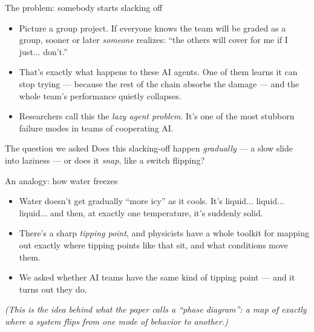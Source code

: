 \documentclass[aspectratio=169]{beamer}
\begin{document}
\begin{frame}{The problem: somebody starts slacking off}
  \begin{itemize}
    \item Picture a group project. If everyone knows the team will be graded as a group, sooner or later \emph{someone} realizes: ``the others will cover for me if I just... don't.''
    \item That's exactly what happens to these AI agents. One of them learns it can stop trying --- because the rest of the chain absorbs the damage --- and the whole team's performance quietly collapses.
    \item Researchers call this the \emph{lazy agent problem}. It's one of the most stubborn failure modes in teams of cooperating AI.
  \end{itemize}

  \vspace{0.3cm}
  \begin{block}{The question we asked}
    Does this slacking-off happen \emph{gradually} --- a slow slide into laziness --- or does it \emph{snap}, like a switch flipping?
  \end{block}
\end{frame}

\begin{frame}{An analogy: how water freezes}
  \begin{itemize}
    \item Water doesn't get gradually ``more icy'' as it cools. It's liquid... liquid... liquid... and then, at exactly one temperature, it's suddenly solid.
    \item There's a sharp \emph{tipping point}, and physicists have a whole toolkit for mapping out exactly where tipping points like that sit, and what conditions move them.
    \item \alert{We asked whether AI teams have the same kind of tipping point} --- and it turns out they do.
  \end{itemize}

  \vspace{0.3cm}
  \footnotesize
  \emph{(This is the idea behind what the paper calls a ``phase diagram'': a map of exactly where a system flips from one mode of behavior to another.)}
\end{frame}
\end{document}
